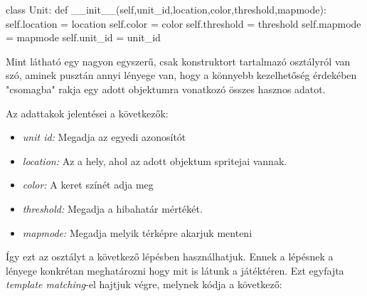 \begin{python}

class Unit:
    def __init__(self,unit_id,location,color,threshold,mapmode):
        self.location = location
        self.color = color
        self.threshold = threshold
        self.mapmode = mapmode
        self.unit_id = unit_id
\end{python}

Mint látható egy nagyon egyszerű, csak konstruktort tartalmazó osztályról van szó, aminek pusztán annyi lényege van, hogy a könnyebb kezelhetőség érdekében "csomagba" rakja egy adott objektumra vonatkozó összes hasznos adatot.

Az adattakok jelentései a következők:
\begin{itemize}
    \item \textit{unit id:} Megadja az egyedi azonosítót
    \item \textit{location:} Az a hely, ahol az adott objektum spritejai vannak.
    \item \textit{color:} A keret színét adja meg
    \item \textit{threshold:} Megadja a hibahatár mértékét. 
    \item \textit{mapmode:} Megadja melyik térképre akarjuk menteni 
    
\end{itemize}

Így ezt az osztályt a következő lépésben használhatjuk. Ennek a lépésnek a lényege konkrétan meghatározni hogy mit is látunk a játéktéren. Ezt egyfajta \textit{template matching}-el hajtjuk végre, melynek kódja a következő:

